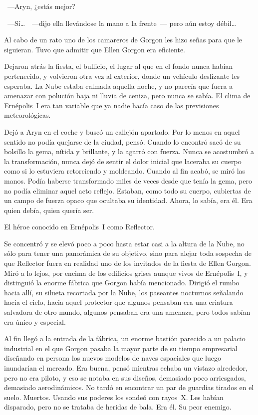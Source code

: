 ~---Aryn, ¿estás mejor?

~---Sí\dots\ ~---dijo ella llevándose la mano a la frente~--- pero aún estoy débil\dots

Al cabo de un rato uno de los camareros de Gorgon les hizo señas para que le siguieran. Tuvo que admitir que Ellen Gorgon era eficiente.

Dejaron atrás la fiesta, el bullicio, el lugar al que en el fondo nunca habían pertenecido, y volvieron otra vez al exterior, donde un vehículo deslizante les esperaba. La Nube estaba calmada aquella noche, y no parecía que fuera a amenazar con polución baja ni lluvia de ceniza, pero nunca se sabía. El clima de Ernépolis~I era tan variable que ya nadie hacía caso de las previsiones meteorológicas.

Dejó a Aryn en el coche y buscó un callejón apartado. Por lo menos en aquel sentido no podía quejarse de la ciudad, pensó. Cuando lo encontró sacó de su bolsillo la gema, nítida y brillante, y la agarró con fuerza. Nunca se acostumbró a la transformación, nunca dejó de sentir el dolor inicial que laceraba su cuerpo como si lo estuviera retorciendo y moldeando. Cuando al fin acabó, se miró las manos. Podía haberse transformado miles de veces desde que tenía la gema, pero no podía eliminar aquel acto reflejo. Estaban, como todo su cuerpo, cubiertas de un campo de fuerza opaco que ocultaba su identidad. Ahora, lo sabía, era él. Era quien debía, quien quería ser.

El héroe conocido en Ernépolis~I como Reflector.

Se concentró y se elevó poco a poco hasta estar casi a la altura de la Nube, no sólo para tener una panorámica de su objetivo, sino para alejar toda sospecha de que Reflector fuera en realidad uno de los invitados de la fiesta de Ellen Gorgon. Miró a lo lejos, por encima de los edificios grises aunque vivos de Ernépolis~I, y distinguió la enorme fábrica que Gorgon había mencionado. Dirigió el rumbo hacia allí, su silueta recortada por la Nube, los paseantes nocturnos señalando hacia el cielo, hacia aquel protector que algunos pensaban era una criatura salvadora de otro mundo, algunos pensaban era una amenaza, pero todos sabían era único y especial.

Al fin llegó a la entrada de la fábrica, un enorme bastión parecido a un palacio industrial en el que Gorgon pasaba la mayor parte de su tiempo empresarial diseñando en persona los nuevos modelos de naves espaciales que luego inundarían el mercado. Era buena, pensó mientras echaba un vistazo alrededor, pero no era piloto, y eso se notaba en sus diseños, demasiado poco arriesgados, demasiado aerodinámicos. No tardó en encontrar un par de guardias tirados en el suelo. Muertos. Usando sus poderes los sondeó con rayos~X. Les habían disparado, pero no se trataba de heridas de bala. Era él. Su peor enemigo.

